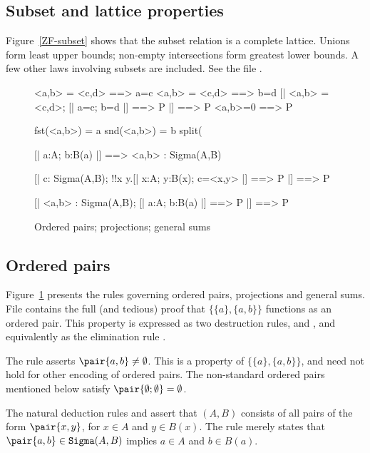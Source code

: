 \subsection{Subset and lattice properties}
Figure~\ref{ZF-subset} shows that the subset relation is a complete
lattice.  Unions form least upper bounds; non-empty intersections form
greatest lower bounds.  A few other laws involving subsets are included.
See the file .


\begin{figure}
\begin{ttbox}
    <a,b> = <c,d> ==> a=c
    <a,b> = <c,d> ==> b=d
     [| <a,b> = <c,d>;  [| a=c; b=d |] ==> P |] ==> P
      <a,b>=0 ==> P

       fst(<a,b>) = a
       snd(<a,b>) = b
     split(%

    [| a:A;  b:B(a) |] ==> <a,b> : Sigma(A,B)

    [| c: Sigma(A,B);  
             !!x y.[| x:A; y:B(x); c=<x,y> |] ==> P |] ==> P

   [| <a,b> : Sigma(A,B);    
             [| a:A;  b:B(a) |] ==> P   |] ==> P
\end{ttbox}
\caption{Ordered pairs; projections; general sums} \label{ZF-pair}
\end{figure}


\subsection{Ordered pairs}
Figure~\ref{ZF-pair} presents the rules governing ordered pairs,
projections and general sums.  File  contains the
full (and tedious) proof that $\{\{a\},\{a,b\}\}$ functions as an ordered
pair.  This property is expressed as two destruction rules,
 and , and equivalently
as the elimination rule .

The rule  asserts $\pair{a,b}\neq\emptyset$.  This
is a property of $\{\{a\},\{a,b\}\}$, and need not hold for other 
encoding of ordered pairs.  The non-standard ordered pairs mentioned below
satisfy $\pair{\emptyset;\emptyset}=\emptyset$.

The natural deduction rules  and 
assert that $(A,B)$ consists of all pairs of the form
$\pair{x,y}$, for $x\in A$ and $y\in B(x)$.  The rule 
merely states that $\pair{a,b}\in {\tt Sigma}(A,B)$ implies $a\in A$ and
$b\in B(a)$.


